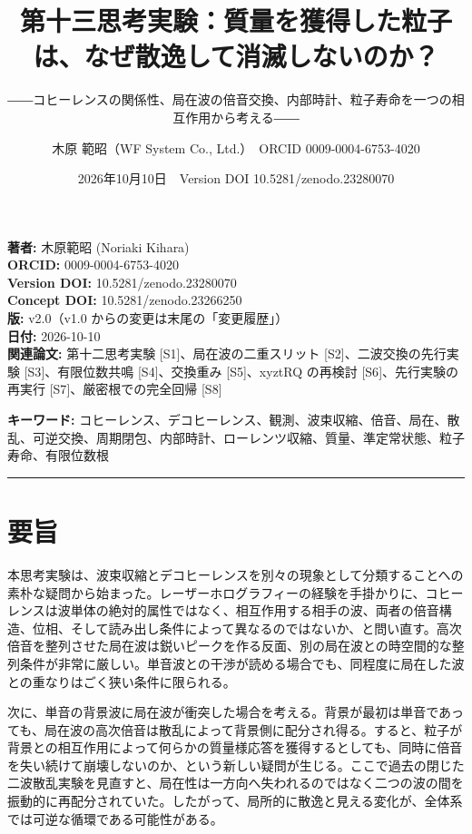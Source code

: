 \documentclass[
  a4paper,
]{ltjsarticle}
\title{第十三思考実験：質量を獲得した粒子は、なぜ散逸して消滅しないのか？}
\subtitle{――コヒーレンスの関係性、局在波の倍音交換、内部時計、粒子寿命を一つの相互作用から考える――}
\author{木原 範昭（WF System Co., Ltd.）　ORCID 0009-0004-6753-4020}
\date{2026年10月10日　Version DOI 10.5281/zenodo.23280070}
\begin{document}
\maketitle

\textbf{著者:} 木原範昭 (Noriaki Kihara)\\
\textbf{ORCID:} 0009-0004-6753-4020\\
\textbf{Version DOI:} 10.5281/zenodo.23280070\\
\textbf{Concept DOI:} 10.5281/zenodo.23266250\\
\textbf{版:} v2.0（v1.0 からの変更は末尾の「変更履歴」）\\
\textbf{日付:} 2026-10-10\\
\textbf{関連論文:} 第十二思考実験 {[}S1{]}、局在波の二重スリット
{[}S2{]}、二波交換の先行実験 {[}S3{]}、有限位数共鳴 {[}S4{]}、交換重み
{[}S5{]}、xyztRQ の再検討 {[}S6{]}、先行実験の再実行
{[}S7{]}、厳密根での完全回帰 {[}S8{]}

\textbf{キーワード:}
コヒーレンス、デコヒーレンス、観測、波束収縮、倍音、局在、散乱、可逆交換、周期閉包、内部時計、ローレンツ収縮、質量、準定常状態、粒子寿命、有限位数根

\begin{center}\rule{0.5\linewidth}{0.5pt}\end{center}

\section{要旨}\label{ux8981ux65e8}

本思考実験は、波束収縮とデコヒーレンスを別々の現象として分類することへの素朴な疑問から始まった。レーザーホログラフィーの経験を手掛かりに、コヒーレンスは波単体の絶対的属性ではなく、相互作用する相手の波、両者の倍音構造、位相、そして読み出し条件によって異なるのではないか、と問い直す。高次倍音を整列させた局在波は鋭いピークを作る反面、別の局在波との時空間的な整列条件が非常に厳しい。単音波との干渉が読める場合でも、同程度に局在した波との重なりはごく狭い条件に限られる。

次に、単音の背景波に局在波が衝突した場合を考える。背景が最初は単音であっても、局在波の高次倍音は散乱によって背景側に配分され得る。すると、粒子が背景との相互作用によって何らかの質量様応答を獲得するとしても、同時に倍音を失い続けて崩壊しないのか、という新しい疑問が生じる。ここで過去の閉じた二波散乱実験を見直すと、局在性は一方向へ失われるのではなく二つの波の間を振動的に再配分されていた。したがって、局所的に散逸と見える変化が、全体系では可逆な循環である可能性がある。
\end{document}
